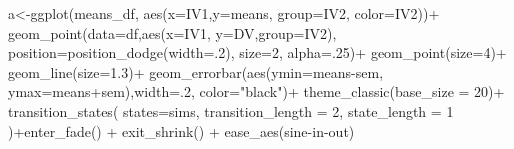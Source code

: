 \documentclass[
  letterpaper,
  DIV=11,
  numbers=noendperiod]{scrreprt}
\newenvironment{Shaded}{\begin{snugshade}}{\end{snugshade}}
\newcommand{\AttributeTok}[1]{\textcolor[rgb]{0.40,0.45,0.13}{#1}}
\newcommand{\DecValTok}[1]{\textcolor[rgb]{0.68,0.00,0.00}{#1}}
\newcommand{\FloatTok}[1]{\textcolor[rgb]{0.68,0.00,0.00}{#1}}
\newcommand{\FunctionTok}[1]{\textcolor[rgb]{0.28,0.35,0.67}{#1}}
\newcommand{\NormalTok}[1]{\textcolor[rgb]{0.00,0.23,0.31}{#1}}
\newcommand{\OtherTok}[1]{\textcolor[rgb]{0.00,0.23,0.31}{#1}}
\newcommand{\SpecialCharTok}[1]{\textcolor[rgb]{0.37,0.37,0.37}{#1}}
\newcommand{\StringTok}[1]{\textcolor[rgb]{0.13,0.47,0.30}{#1}}
\begin{document}
\begin{Shaded}
\begin{Highlighting}[]
\NormalTok{a}\OtherTok{\textless{}{-}}\FunctionTok{ggplot}\NormalTok{(means\_df, }\FunctionTok{aes}\NormalTok{(}\AttributeTok{x=}\NormalTok{IV1,}\AttributeTok{y=}\NormalTok{means, }
                                           \AttributeTok{group=}\NormalTok{IV2,}
                                           \AttributeTok{color=}\NormalTok{IV2))}\SpecialCharTok{+}
  \FunctionTok{geom\_point}\NormalTok{(}\AttributeTok{data=}\NormalTok{df,}\FunctionTok{aes}\NormalTok{(}\AttributeTok{x=}\NormalTok{IV1, }\AttributeTok{y=}\NormalTok{DV,}\AttributeTok{group=}\NormalTok{IV2), }
             \AttributeTok{position=}\FunctionTok{position\_dodge}\NormalTok{(}\AttributeTok{width=}\NormalTok{.}\DecValTok{2}\NormalTok{),}
             \AttributeTok{size=}\DecValTok{2}\NormalTok{,}
             \AttributeTok{alpha=}\NormalTok{.}\DecValTok{25}\NormalTok{)}\SpecialCharTok{+}
  \FunctionTok{geom\_point}\NormalTok{(}\AttributeTok{size=}\DecValTok{4}\NormalTok{)}\SpecialCharTok{+}
  \FunctionTok{geom\_line}\NormalTok{(}\AttributeTok{size=}\FloatTok{1.3}\NormalTok{)}\SpecialCharTok{+}
  \FunctionTok{geom\_errorbar}\NormalTok{(}\FunctionTok{aes}\NormalTok{(}\AttributeTok{ymin=}\NormalTok{means}\SpecialCharTok{{-}}\NormalTok{sem, }\AttributeTok{ymax=}\NormalTok{means}\SpecialCharTok{+}\NormalTok{sem),}\AttributeTok{width=}\NormalTok{.}\DecValTok{2}\NormalTok{,}
                \AttributeTok{color=}\StringTok{"black"}\NormalTok{)}\SpecialCharTok{+}
  \FunctionTok{theme\_classic}\NormalTok{(}\AttributeTok{base\_size =} \DecValTok{20}\NormalTok{)}\SpecialCharTok{+}
  \FunctionTok{transition\_states}\NormalTok{(}
    \AttributeTok{states=}\NormalTok{sims,}
    \AttributeTok{transition\_length =} \DecValTok{2}\NormalTok{,}
    \AttributeTok{state\_length =} \DecValTok{1}
\NormalTok{  )}\SpecialCharTok{+}\FunctionTok{enter\_fade}\NormalTok{() }\SpecialCharTok{+} 
  \FunctionTok{exit\_shrink}\NormalTok{() }\SpecialCharTok{+}
  \FunctionTok{ease\_aes}\NormalTok{(}\StringTok{\textquotesingle{}sine{-}in{-}out\textquotesingle{}}\NormalTok{)}


\end{Highlighting}
\end{Shaded}
\end{document}
